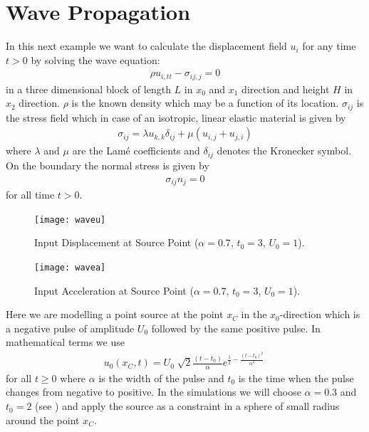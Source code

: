 \section{Wave Propagation}
\label{WAVE CHAP}

In this next example we want to calculate the displacement field $u_{i}$ for any time $t>0$ by solving the wave equation:
\begin{eqnarray}\label{WAVE general problem}
\rho u_{i,tt} - \sigma_{ij,j}=0
\end{eqnarray}
in a three dimensional block of length $L$ in $x_{0}$
and $x_{1}$ direction and height $H$ in $x_{2}$ direction.
$\rho$ is the known density which may be a function of its location.
$\sigma_{ij}$ is the stress field which in case of an
isotropic, linear elastic material is given by
\begin{eqnarray}\label{WAVE stress}
\sigma_{ij} = \lambda u_{k,k} \delta_{ij} + \mu (u_{i,j} + u_{j,i})
\end{eqnarray}
where $\lambda$ and $\mu$ are the Lam\'e coefficients
and $\delta_{ij}$ denotes the Kronecker symbol.
On the boundary the normal stress is given by
\begin{eqnarray}\label{WAVE natural}
\sigma_{ij}n_{j}=0
\end{eqnarray}
for all time $t>0$.

\begin{figure}[t!]
\centerline{\texttt{[image: waveu]}}
\caption{Input Displacement at Source Point ($\alpha=0.7$, $t_{0}=3$, $U_{0}=1$).}
\label{WAVE FIG 1.2}
\end{figure}

\begin{figure}
\centerline{\texttt{[image: wavea]}}
\caption{Input Acceleration at Source Point ($\alpha=0.7$, $t_{0}=3$, $U_{0}=1$).}
\label{WAVE FIG 1.1}
\end{figure}

Here we are modelling a point source at the point $x_C$ in the
$x_{0}$-direction which is a negative pulse of amplitude
$U_{0}$ followed by the same positive pulse.
In mathematical terms we use
\begin{eqnarray} \label{WAVE source}
u_{0}(x_C,t)= U_{0} \; \sqrt{2}  \frac{(t-t_{0})}{\alpha} e^{\frac{1}{2}-\frac{(t-t_{0})^2}{\alpha^2}} \ 
\end{eqnarray}
for all $t\ge0$ where $\alpha$ is the width of the pulse and $t_{0}$
is the time when the pulse changes from negative to positive.
In the simulations we will choose $\alpha=0.3$ and $t_{0}=2$ (see
\fig{WAVE FIG 1.2}) and apply the source as a constraint in a sphere of small
radius around the point $x_C$.  


